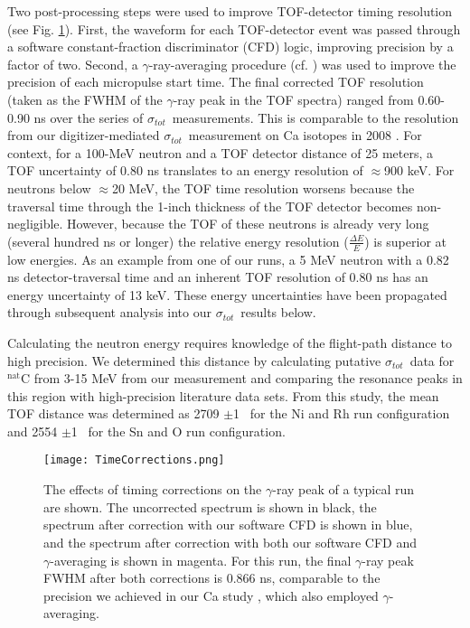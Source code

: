 \documentclass[twocolumn,secnumarabic,amssymb, nobibnotes, aps, prl,
superscriptaddress, nobalancelastpage, floatfix]{revtex4}
\newcommand{\tot}{\ensuremath{\sigma_{tot}}}
\begin{document}
Two post-processing steps were used to improve TOF-detector timing resolution (see Fig.
\ref{TimingCorrectionStudy}). First, the waveform for each TOF-detector event
was passed through a software constant-fraction discriminator (CFD) logic, improving 
precision by a factor of two. Second, a $\gamma$-ray-averaging procedure (cf. \cite{Shane2010}) was
used to improve the precision of each micropulse start time. The final corrected TOF resolution (taken
as the FWHM of the $\gamma$-ray peak in the TOF spectra) ranged from
0.60-0.90 ns over the series of \tot\ measurements.
This is comparable to the resolution from 
our digitizer-mediated \tot\ measurement on Ca isotopes in 2008 \cite{Shane2010}.
For context, for a 100-MeV neutron and a TOF detector distance of 25 meters, a TOF 
uncertainty of 0.80 ns translates to an energy resolution of $\approx$900 keV.
For neutrons below $\approx$20 MeV, the TOF time resolution worsens because the traversal time 
through the 1-inch thickness of the TOF detector becomes non-negligible.
However, because the TOF of these neutrons is already very long (several hundred ns or
longer) the relative energy resolution ($\frac{\Delta E}{E}$) is
superior at low energies. As an example from one of our runs, a 5 MeV neutron with
a 0.82 ns detector-traversal time and an inherent TOF resolution of 0.80 ns
has an energy uncertainty of 13 keV. These energy uncertainties
have been propagated through subsequent analysis into our \tot\ results below.

Calculating the neutron energy requires knowledge of the flight-path
distance to high precision. We determined this distance by calculating 
putative \tot\ data for $^{\text{nat}}$C from 3-15 MeV from our measurement and 
comparing the resonance peaks in this region with high-precision literature data
sets. From this study, the mean TOF distance was determined as 2709 $\pm$1
\centi\meter\ for the Ni and Rh run configuration and 2554
$\pm$1 \centi\meter\ for the Sn and O run configuration.
\begin{figure}
    \texttt{[image: TimeCorrections.png]}
    \caption{The effects of timing corrections on the $\gamma$-ray
        peak of a typical run are shown. The uncorrected spectrum is shown in black,
        the spectrum after correction with our software CFD is shown in blue,
        and the spectrum after correction with both our software CFD and
        $\gamma$-averaging is shown in magenta. For this run, the final $\gamma$-ray peak 
        FWHM after both corrections is 0.866 ns, comparable to the precision we
        achieved in our Ca study \cite{Shane2010}, which also employed $\gamma$-averaging.}
    \label{TimingCorrectionStudy}
\end{figure}
\end{document}
